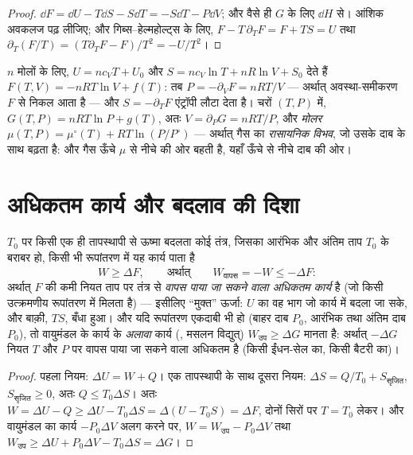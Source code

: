 \begin{proof}
$\dd F = \dd U - T\dd S - S\dd T = -S\dd T - P\dd V$; और वैसे ही $G$ के लिए
$\dd H$ से। आंशिक अवकलज पढ़ लीजिए; और गिब्स--हेल्महोल्ट्स के लिए,
$F - T\,\partial_TF = F + TS = U$ तथा $\partial_T(F/T) = (T\partial_TF -
F)/T^2 = -U/T^2$।
\end{proof}

\begin{example}[पूर्ण गैस]\label{ex:b2:thermodynamic-potentials:perfect}
$n$ मोलों के लिए, $U = nc_{V}T + U_0$ और $S = nc_V\ln T + nR\ln V + S_0$
देते हैं $F(T,V) = -nRT\ln V + f(T)$: तब $P = -\partial_VF = nRT/V$
--- अर्थात् अवस्था-समीकरण $F$ से निकल आता है --- और $S = -\partial_TF$
एंट्रॉपी लौटा देता है। चरों $(T,P)$ में, $G(T,P) = nRT\ln P +
g(T)$, अतः $V = \partial_PG = nRT/P$, और \emph{मोलर} 
$\mu(T,P) = \mu^\circ(T) + RT\ln(P/P^\circ)$ --- अर्थात् गैस का \emph{रासायनिक
विभव}, जो उसके दाब के साथ बढ़ता है: और गैस ऊँचे $\mu$ से
नीचे की ओर बहती है, यहाँ ऊँचे से नीचे दाब की ओर।
\end{example}

\section{अधिकतम कार्य और बदलाव की दिशा}

\begin{theorem}\label{thm:b2:thermodynamic-potentials:monothermal}
$T_0$ पर किसी एक ही तापस्थापी से ऊष्मा बदलता कोई तंत्र, जिसका
आरंभिक और अंतिम ताप $T_0$ के बराबर हो, किसी भी रूपांतरण में
यह कार्य पाता है
\[
W \ge \Delta F , \qquad\text{अर्थात्}\qquad W_{\text{वापस}} = -W \le -\Delta F :
\]
अर्थात् $F$ की कमी नियत ताप पर तंत्र से \emph{वापस पाया जा सकने वाला अधिकतम
कार्य} है (जो किसी उत्क्रमणीय रूपांतरण में मिलता है) ---
इसीलिए ``मुक्त'' ऊर्जा: $U$ का वह भाग जो कार्य में बदला जा सके, और
बाक़ी, $TS$, बँधा हुआ। और यदि रूपांतरण एकदाबी भी हो
(बाहर दाब $P_0$, आरंभिक तथा अंतिम दाब $P_0$), तो वायुमंडल के कार्य के
\emph{अलावा} कार्य (, मसलन विद्युत्)
$W_{\text{उप}} \ge \Delta G$ मानता है: अर्थात् $-\Delta G$ नियत $T$ और $P$ पर वापस पाया जा
सकने वाला अधिकतम  है (किसी ईंधन-सेल का, किसी
बैटरी का)।
\end{theorem}

\begin{proof}
पहला नियम: $\Delta U = W + Q$। एक तापस्थापी के साथ दूसरा नियम: $\Delta S
= Q/T_0 + S_{\text{सृजित}}$, $S_{\text{सृजित}} \ge 0$, अतः $Q \le T_0\Delta S$। अतः
$W = \Delta U - Q \ge \Delta U - T_0\Delta S = \Delta(U - T_0S) = \Delta F$, दोनों सिरों पर
$T = T_0$ लेकर। और वायुमंडल का कार्य $-P_0\Delta V$
अलग करने पर, $W = W_{\text{उप}} - P_0\Delta V$ तथा $W_{\text{उप}} \ge \Delta U + P_0
\Delta V - T_0\Delta S = \Delta G$।
\end{proof}

